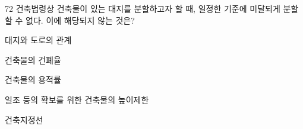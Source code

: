 \begin{question}{72}
건축법령상 건축물이 있는 대지를 분할하고자 할 때, 일정한 기준에 미달되게 분할할 수 없다. 이에 해당되지 않는 것은?
\begin{choices}
  \item 대지와 도로의 관계
  \item 건축물의 건폐율
  \item 건축물의 용적률
  \item 일조 등의 확보를 위한 건축물의 높이제한
  \item 건축지정선
\end{choices}
\end{question}
